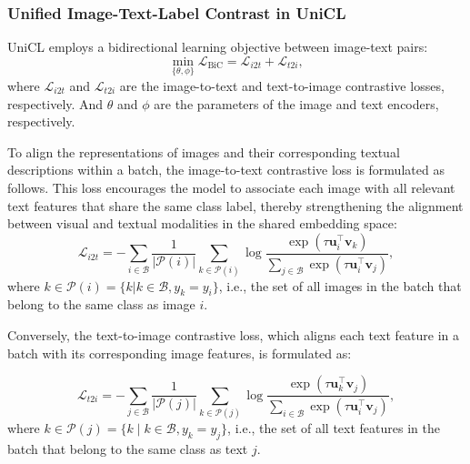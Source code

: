 \subsubsection{Unified Image-Text-Label Contrast in UniCL}
\label{subsec:unified_image_text_label_contrast}

UniCL employs a bidirectional learning objective between image-text pairs:
\begin{equation} \label{eq:unified_image_text_label_contrast}
    \min_{\{\theta, \phi\}} \mathcal{L}_{\text{BiC}} = \mathcal{L}_{i2t} + \mathcal{L}_{t2i},
\end{equation}
where \(\mathcal{L}_{i2t}\) and \(\mathcal{L}_{t2i}\) are the image-to-text and text-to-image contrastive losses, respectively. And \(\theta\) and \(\phi\) are the parameters of the image and text encoders, respectively.

To align the representations of images and their corresponding textual descriptions within a batch, the image-to-text contrastive loss is formulated as follows. This loss encourages the model to associate each image with all relevant text features that share the same class label, thereby strengthening the alignment between visual and textual modalities in the shared embedding space:
\begin{equation} \label{eq:unicl_image_to_text_contrastive_loss}
    \mathcal{L}_{i2t} = - \sum_{i \in \mathcal{B}} \frac{1}{|\mathcal{P}(i)|} \sum_{k \in \mathcal{P}(i)} 
    \log \frac{\exp(\tau \mathbf{u}_i^\top \mathbf{v}_k)}{\sum_{j \in \mathcal{B}} \exp(\tau \mathbf{u}_i^\top \mathbf{v}_j)},
\end{equation}
where $k \in \mathcal{P}(i) = \{k | k \in \mathcal{B}, y_k = y_i\}$, i.e., the set of all images in the batch that belong to the same class as image $i$.

Conversely, the text-to-image contrastive loss, which aligns each text feature in a batch with its corresponding image features, is formulated as:

\begin{equation} \label{eq:unicl_text_to_image_contrastive_loss}
    \mathcal{L}_{t2i} = - \sum_{j \in \mathcal{B}} \frac{1}{|\mathcal{P}(j)|} \sum_{k \in \mathcal{P}(j)} 
    \log \frac{\exp(\tau \mathbf{u}_k^\top \mathbf{v}_j)}{\sum_{i \in \mathcal{B}} \exp(\tau \mathbf{u}_i^\top \mathbf{v}_j)},
\end{equation}
where $k \in \mathcal{P}(j) = \{k \mid k \in \mathcal{B}, y_k = y_j\}$, i.e., the set of all text features in the batch that belong to the same class as text $j$.

